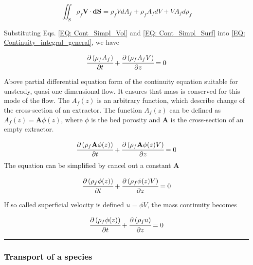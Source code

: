 \documentclass[../Article_Model_Parameters.tex]{subfiles}
\begin{document}
	{\footnotesize
		\begin{equation}
			\iint_S \rho_f \textbf{V} \cdot \textbf{dS} = \rho_f V dA_f + \rho_f A_f dV + V A_f d\rho_f 
			\label{EQ: Cont_Simpl_Surf}
		\end{equation}
	}

	Substituting Eqs. \ref{EQ: Cont_Simpl_Vol} and \ref{EQ: Cont_Simpl_Surf} into \ref{EQ: Continuity_integral_general}, we have
	
	{\footnotesize
		\begin{equation}
			\cfrac{\partial \left( \rho_f A_f \right)}{\partial t} + \cfrac{\partial \left( \rho_f A_f V \right)}{\partial z} = 0
			\label{EQ: Conservative_continuity}
		\end{equation}
	}
	
	Above partial differential equation form of the continuity equation suitable for unsteady, quasi-one-dimensional flow. It ensures that mass is conserved for this mode of the flow. The $A_f(z)$ is an arbitrary function, which describe change of the cross-section of an extractor. The function $A_f(z)$ can be defined as $A_f(z) = \textbf{A} \phi(z)$, where $\phi$ is the bed porosity and $\textbf{A}$ is the cross-section of an empty extractor.
	
	{\footnotesize
		\begin{equation}
			\cfrac{\partial \left( \rho_f \textbf{A} \phi (z) \right)}{\partial t} + \cfrac{\partial \left( \rho_f \textbf{A} \phi (z) V \right)}{\partial z} = 0
		\end{equation}
	}
	The equation can be simplified by cancel out a constant $\textbf{A}$
	
	{\footnotesize
		\begin{equation}
			\cfrac{\partial \left( \rho_f \phi (z) \right)}{\partial t} + \cfrac{\partial \left( \rho_f \phi (z) V \right)}{\partial z} = 0
		\end{equation}
	}
	
	If so called superficial velocity is defined $u=\phi V$, the mass continuity becomes
	
	{\footnotesize
		\begin{equation}
			\cfrac{\partial \left( \rho_f \phi (z) \right)}{\partial t} + \cfrac{\partial \left( \rho_f u \right)}{\partial z} = 0
			\label{EQ: Mass_Continuity}
		\end{equation}
	}
	
	\hrule
	
	\subsubsection{Transport of a species}
	
\end{document}
